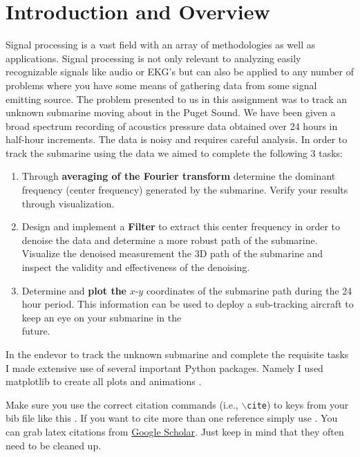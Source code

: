 \documentclass[11pt]{amsart}
\begin{document}
\section{Introduction and Overview}\label{sec:Introduction}
Signal processing is a vast field with an array of methodologies as well as applications.
Signal processing is not only relevant to analyzing easily recognizable signals like audio or EKG's but can also be applied to any number of problems where you have some means of gathering data from some signal emitting source.
The problem presented to us in this assignment was to track an unknown submarine moving about in the Puget Sound.
We have been given a broad spectrum recording of acoustics pressure data obtained over 24 hours in half-hour increments.
The data is noisy and requires careful analysis.
In order to track the submarine using the data we aimed to complete the following 3 tasks: \\
\begin{enumerate}
\item Through \textbf{averaging of the Fourier transform} determine the dominant frequency (center frequency)
generated by the submarine. Verify your results through visualization. \\

\item Design and implement a \textbf{Filter} to extract this center frequency in order to denoise the data and
determine a more robust path of the submarine. Visualize the denoised measurement the 3D path of
the submarine and inspect the validity and effectiveness of the denoising. \\

\item Determine and \textbf{plot the} $x$-$y$ coordinates of the submarine path during the 24 hour period. This
information can be used to deploy a sub-tracking aircraft to keep an eye on your submarine in the \\
future.

\end{enumerate}

In the endevor to track the unknown submarine and complete the requisite tasks I made extensive use of several important Python packages.
Namely I used matplotlib to create all plots and animations \cite{Hunter:2007}.

Make sure you use the correct citation commands (i.e., \texttt{$\backslash$cite}) to keys 
from your bib file like this \cite{example-article-citation}. If you want 
to cite more than one reference simply use \cite{example-article-citation, example-book-citation}. You can grab latex citations 
from \href{https://scholar.google.com}{Google Scholar}. Just keep in mind that they often 
need to be cleaned up.
\end{document}
